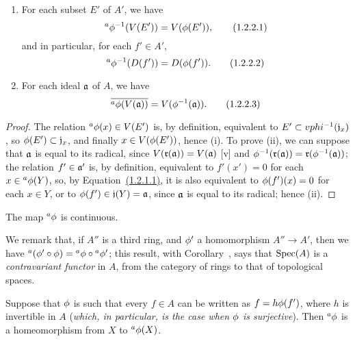 \begin{prop}[1.2.2]
\label{1.1.2.2}
\medskip\noindent
\begin{enumerate}[label=\emph{(\roman*)}]
  \item For each subset $E'$ of $A'$, we have
    \[
      {}^a\phi^{-1}(V(E'))=V(\phi(E')),
      \tag{1.2.2.1}
    \]
    and in particular, for each $f'\in A'$,
    \[
      {}^a\phi^{-1}(D(f'))=D(\phi(f')).
      \tag{1.2.2.2}
    \]
  \item For each ideal $\mathfrak{a}$ of $A$, we have
    \[
      \overline{{}^a\phi(V(\mathfrak{a}))}=V(\phi^{-1}(\mathfrak{a})).
      \tag{1.2.2.3}
    \]
\end{enumerate}
\end{prop}

\begin{proof}
\label{proof-1.1.2.2}
The relation ${}^a\phi(x)\in V(E')$ is, by definition, equivalent to $E'\subset vphi^{-1}(\mathfrak{j}_x)$, so $\phi(E')\subset\mathfrak{j}_x$, and finally $x\in V(\phi(E'))$, hence (i).
To prove (ii), we can suppose that $\mathfrak{a}$ is equal to its radical, since $V(\mathfrak{r}(\mathfrak{a}))=V(\mathfrak{a})$ [v] and $\phi^{-1}(\mathfrak{r}(\mathfrak{a}))=\mathfrak{r}(\phi^{-1}(\mathfrak{a}))$;
the relation $f'\in\mathfrak{a}'$ is, by definition, equivalent to $f'(x')=0$ for each $x\in{{}^a\phi(Y)}$, so, by Equation~\hyperref[1.1.2.1]{(1.2.1.1)}, it is also equivalent to $\phi(f')(x)=0$ for each $x\in Y$, or to $\phi(f')\in\mathfrak{j}(Y)=\mathfrak{a}$, since $\mathfrak{a}$ is equal to its radical;
hence (ii).
\end{proof}

\begin{cor}[1.2.3]
\label{1.1.2.3}
The map ${}^a\phi$ is continuous.
\end{cor}

We remark that, if $A''$ is a third ring, and $\phi'$ a homomorphism $A''\to A'$, then we have ${}^a(\phi'\circ\phi)={}^a\phi\circ{}^a\phi'$;
this result, with Corollary~, says that ${\mathop{\mathrm{Spec}}\nolimits}(A)$ is a \emph{contravariant functor} in $A$, from the category of rings to that of topological spaces.

\begin{cor}[1.2.4]
\label{1.1.2.4}
Suppose that $\phi$ is such that every $f\in A$ can be written as $f=h\phi(f')$, where $h$ is invertible in $A$ (\emph{which, in particular, is the case when $\phi$ is \emph{surjective}}).
Then ${}^a\phi$ is a homeomorphism from $X$ to ${}^a\phi(X)$.
\end{cor}

